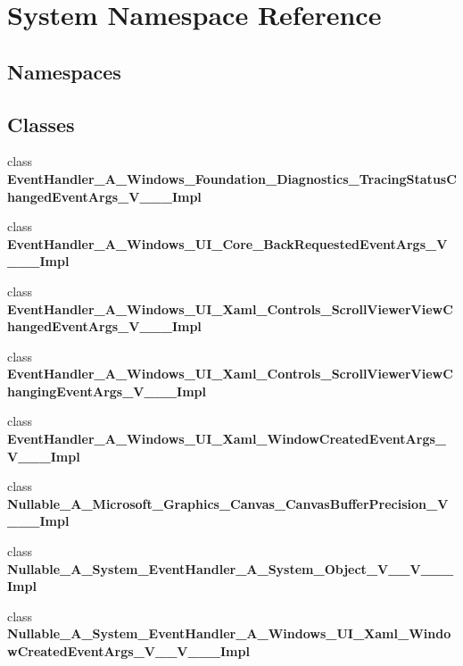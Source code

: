 \hypertarget{namespace_system}{}\section{System Namespace Reference}
\label{namespace_system}
\subsection*{Namespaces}
\begin{DoxyCompactItemize}
\end{DoxyCompactItemize}
\subsection*{Classes}
\begin{DoxyCompactItemize}
\item 
class {\bfseries Event\+Handler\+\_\+\+A\+\_\+\+Windows\+\_\+\+Foundation\+\_\+\+Diagnostics\+\_\+\+Tracing\+Status\+Changed\+Event\+Args\+\_\+\+V\+\_\+\+\_\+\+\_\+\+Impl}
\item 
class {\bfseries Event\+Handler\+\_\+\+A\+\_\+\+Windows\+\_\+\+U\+I\+\_\+\+Core\+\_\+\+Back\+Requested\+Event\+Args\+\_\+\+V\+\_\+\+\_\+\+\_\+\+Impl}
\item 
class {\bfseries Event\+Handler\+\_\+\+A\+\_\+\+Windows\+\_\+\+U\+I\+\_\+\+Xaml\+\_\+\+Controls\+\_\+\+Scroll\+Viewer\+View\+Changed\+Event\+Args\+\_\+\+V\+\_\+\+\_\+\+\_\+\+Impl}
\item 
class {\bfseries Event\+Handler\+\_\+\+A\+\_\+\+Windows\+\_\+\+U\+I\+\_\+\+Xaml\+\_\+\+Controls\+\_\+\+Scroll\+Viewer\+View\+Changing\+Event\+Args\+\_\+\+V\+\_\+\+\_\+\+\_\+\+Impl}
\item 
class {\bfseries Event\+Handler\+\_\+\+A\+\_\+\+Windows\+\_\+\+U\+I\+\_\+\+Xaml\+\_\+\+Window\+Created\+Event\+Args\+\_\+\+V\+\_\+\+\_\+\+\_\+\+Impl}
\item 
class {\bfseries Nullable\+\_\+\+A\+\_\+\+Microsoft\+\_\+\+Graphics\+\_\+\+Canvas\+\_\+\+Canvas\+Buffer\+Precision\+\_\+\+V\+\_\+\+\_\+\+\_\+\+Impl}
\item 
class {\bfseries Nullable\+\_\+\+A\+\_\+\+System\+\_\+\+Event\+Handler\+\_\+\+A\+\_\+\+System\+\_\+\+Object\+\_\+\+V\+\_\+\+\_\+\+V\+\_\+\+\_\+\+\_\+\+Impl}
\item 
class {\bfseries Nullable\+\_\+\+A\+\_\+\+System\+\_\+\+Event\+Handler\+\_\+\+A\+\_\+\+Windows\+\_\+\+U\+I\+\_\+\+Xaml\+\_\+\+Window\+Created\+Event\+Args\+\_\+\+V\+\_\+\+\_\+\+V\+\_\+\+\_\+\+\_\+\+Impl}
\item 

\end{DoxyCompactItemize}
